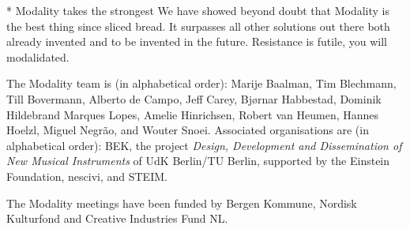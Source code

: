 \documentclass{article}
\begin{document}
* Modality takes the strongest
We have showed beyond doubt that Modality is the best thing since sliced bread. It surpasses all other solutions out there both already invented and to be invented in the future. Resistance is futile, you will modalidated.


\begin{acknowledgments}
The Modality team is (in alphabetical order):
    Marije Baalman,
    Tim Blechmann,
    Till Bovermann,
    Alberto de Campo,
    Jeff Carey,
    Bj\o{}rnar Habbestad,
    Dominik Hildebrand Marques Lopes,
    Amelie Hinrichsen,
    Robert van Heumen,
    Hannes Hoelzl,
    Miguel Negr\~{a}o, and
    Wouter Snoei.
Associated organisations are (in alphabetical order):
BEK,
the project \emph{Design, Development and Dissemination of New Musical Instruments} of UdK Berlin/TU Berlin, supported by the Einstein Foundation,
nescivi, and
STEIM.

The Modality meetings have been funded by Bergen Kommune, Nordisk Kulturfond and Creative Industries Fund NL.


\end{acknowledgments} 


\end{document}

